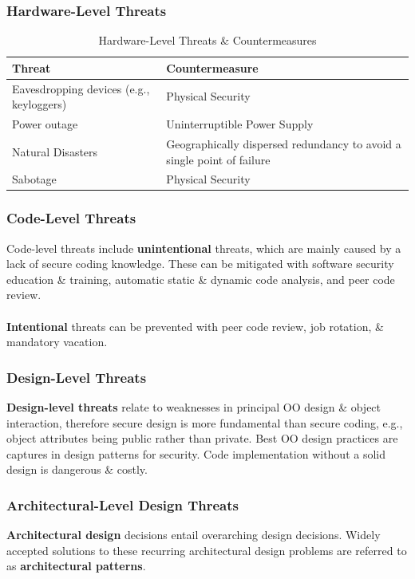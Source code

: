\documentclass[a4paper,11pt]{article}
\begin{document}
\subsubsection{Hardware-Level Threats}
\begin{table}[h!]
    \centering

    \begin{tabular}{|>{\arraybackslash}p{}|>{\arraybackslash}p{}|}
        \hline
        \textbf{Threat}                             & \textbf{Countermeasure} \\ \hline
        Eavesdropping devices (e.g., keyloggers)    & Physical Security \\ \hline
        Power outage                                & Uninterruptible Power Supply \\ \hline
        Natural Disasters                           & Geographically dispersed redundancy to avoid a single point of failure \\ \hline
        Sabotage & Physical Security \\ \hline
    \end{tabular}
    \caption{Hardware-Level Threats \& Countermeasures}
\end{table}

\subsubsection{Code-Level Threats}
Code-level threats include \textbf{unintentional} threats, which are mainly caused by a lack of secure coding knowledge.
These can be mitigated with software security education \& training, automatic static \& dynamic code analysis, and peer code review.
\\\\
\textbf{Intentional} threats can be prevented with peer code review, job rotation, \& mandatory vacation.

\subsubsection{Design-Level Threats}
\textbf{Design-level threats} relate to weaknesses in principal OO design \& object interaction, therefore secure design is more fundamental than secure coding, e.g., object attributes being public rather than private.
Best OO design practices are captures in design patterns for security.
Code implementation without a solid design is dangerous \& costly.

\subsubsection{Architectural-Level Design Threats}
\textbf{Architectural design} decisions entail overarching design decisions.
Widely accepted solutions to these recurring architectural design problems are referred to as \textbf{architectural patterns}.
\end{document}
